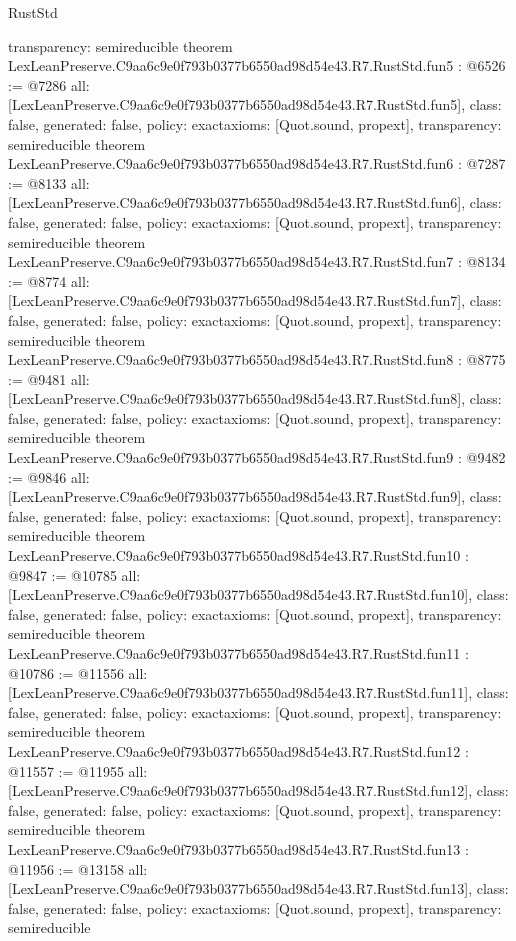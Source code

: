 \begin{lexlean}{RustStd}
\begin{coremodule}
{  transparency: semireducible
}
theorem LexLeanPreserve.C9aa6c9e0f793b0377b6550ad98d54e43.R7.RustStd.fun5 : @6526 := @7286 {
  all: [LexLeanPreserve.C9aa6c9e0f793b0377b6550ad98d54e43.R7.RustStd.fun5],
  class: false,
  generated: false,
  policy: exact{axioms: [Quot.sound, propext]},
  transparency: semireducible
}
theorem LexLeanPreserve.C9aa6c9e0f793b0377b6550ad98d54e43.R7.RustStd.fun6 : @7287 := @8133 {
  all: [LexLeanPreserve.C9aa6c9e0f793b0377b6550ad98d54e43.R7.RustStd.fun6],
  class: false,
  generated: false,
  policy: exact{axioms: [Quot.sound, propext]},
  transparency: semireducible
}
theorem LexLeanPreserve.C9aa6c9e0f793b0377b6550ad98d54e43.R7.RustStd.fun7 : @8134 := @8774 {
  all: [LexLeanPreserve.C9aa6c9e0f793b0377b6550ad98d54e43.R7.RustStd.fun7],
  class: false,
  generated: false,
  policy: exact{axioms: [Quot.sound, propext]},
  transparency: semireducible
}
theorem LexLeanPreserve.C9aa6c9e0f793b0377b6550ad98d54e43.R7.RustStd.fun8 : @8775 := @9481 {
  all: [LexLeanPreserve.C9aa6c9e0f793b0377b6550ad98d54e43.R7.RustStd.fun8],
  class: false,
  generated: false,
  policy: exact{axioms: [Quot.sound, propext]},
  transparency: semireducible
}
theorem LexLeanPreserve.C9aa6c9e0f793b0377b6550ad98d54e43.R7.RustStd.fun9 : @9482 := @9846 {
  all: [LexLeanPreserve.C9aa6c9e0f793b0377b6550ad98d54e43.R7.RustStd.fun9],
  class: false,
  generated: false,
  policy: exact{axioms: [Quot.sound, propext]},
  transparency: semireducible
}
theorem LexLeanPreserve.C9aa6c9e0f793b0377b6550ad98d54e43.R7.RustStd.fun10 : @9847 := @10785 {
  all: [LexLeanPreserve.C9aa6c9e0f793b0377b6550ad98d54e43.R7.RustStd.fun10],
  class: false,
  generated: false,
  policy: exact{axioms: [Quot.sound, propext]},
  transparency: semireducible
}
theorem LexLeanPreserve.C9aa6c9e0f793b0377b6550ad98d54e43.R7.RustStd.fun11 : @10786 := @11556 {
  all: [LexLeanPreserve.C9aa6c9e0f793b0377b6550ad98d54e43.R7.RustStd.fun11],
  class: false,
  generated: false,
  policy: exact{axioms: [Quot.sound, propext]},
  transparency: semireducible
}
theorem LexLeanPreserve.C9aa6c9e0f793b0377b6550ad98d54e43.R7.RustStd.fun12 : @11557 := @11955 {
  all: [LexLeanPreserve.C9aa6c9e0f793b0377b6550ad98d54e43.R7.RustStd.fun12],
  class: false,
  generated: false,
  policy: exact{axioms: [Quot.sound, propext]},
  transparency: semireducible
}
theorem LexLeanPreserve.C9aa6c9e0f793b0377b6550ad98d54e43.R7.RustStd.fun13 : @11956 := @13158 {
  all: [LexLeanPreserve.C9aa6c9e0f793b0377b6550ad98d54e43.R7.RustStd.fun13],
  class: false,
  generated: false,
  policy: exact{axioms: [Quot.sound, propext]},
  transparency: semireducible
}
\end{coremodule}
\end{lexlean}
